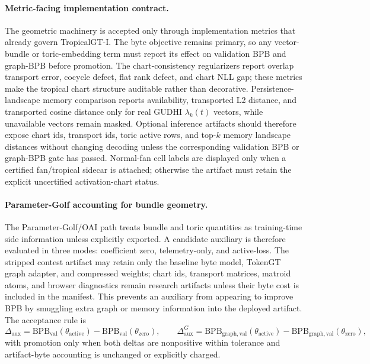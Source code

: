 \documentclass[11pt]{article}
\begin{document}
\paragraph{Metric-facing implementation contract.}
The geometric machinery is accepted only through implementation metrics that already govern TropicalGT-I.  The byte objective remains primary, so any vector-bundle or toric-embedding term must report its effect on validation BPB and graph-BPB before promotion.  The chart-consistency regularizers report overlap transport error, cocycle defect, flat rank defect, and chart NLL gap; these metrics make the tropical chart structure auditable rather than decorative.  Persistence-landscape memory comparison reports availability, transported L2 distance, and transported cosine distance only for real GUDHI $\lambda_k(t)$ vectors, while unavailable vectors remain masked.  Optional inference artifacts should therefore expose chart ids, transport ids, toric active rows, and top-$k$ memory landscape distances without changing decoding unless the corresponding validation BPB or graph-BPB gate has passed.  Normal-fan cell labels are displayed only when a certified fan/tropical sidecar is attached; otherwise the artifact must retain the explicit uncertified activation-chart status.

\paragraph{Parameter-Golf accounting for bundle geometry.}
The Parameter-Golf/OAI path treats bundle and toric quantities as training-time side information unless explicitly exported.  A candidate auxiliary is therefore evaluated in three modes: coefficient zero, telemetry-only, and active-loss.  The stripped contest artifact may retain only the baseline byte model, TokenGT graph adapter, and compressed weights; chart ids, transport matrices, matroid atoms, and browser diagnostics remain research artifacts unless their byte cost is included in the manifest.  This prevents an auxiliary from appearing to improve BPB by smuggling extra graph or memory information into the deployed artifact.  The acceptance rule is
\[
  \Delta_{\mathrm{aux}}=\mathrm{BPB}_{\mathrm{val}}(\theta_{\mathrm{active}})-\mathrm{BPB}_{\mathrm{val}}(\theta_{\mathrm{zero}}),
  \qquad
  \Delta^{G}_{\mathrm{aux}}=\mathrm{BPB}_{\mathrm{graph,val}}(\theta_{\mathrm{active}})-\mathrm{BPB}_{\mathrm{graph,val}}(\theta_{\mathrm{zero}}),
\]
with promotion only when both deltas are nonpositive within tolerance and artifact-byte accounting is unchanged or explicitly charged.
\end{document}
